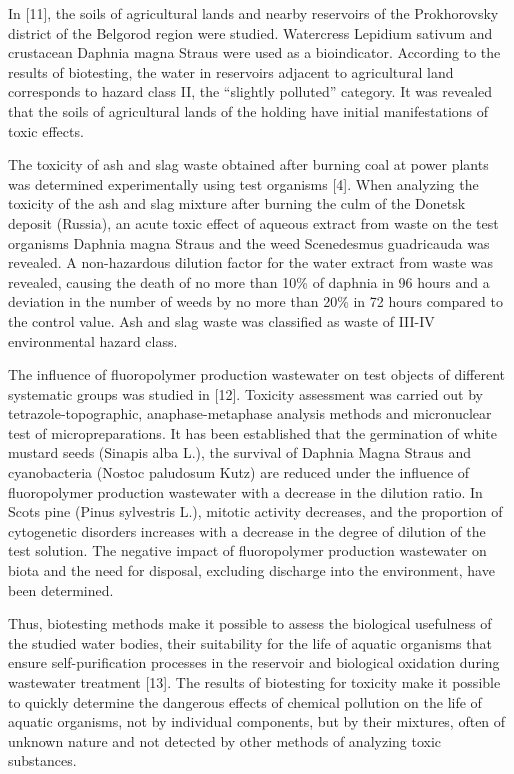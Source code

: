 \begin{multicols}{2}
In {[}11{]}, the soils of agricultural lands and nearby reservoirs of
the Prokhorovsky district of the Belgorod region were studied.
Watercress Lepidium sativum and crustacean Daphnia magna Straus were
used as a bioindicator. According to the results of biotesting, the
water in reservoirs adjacent to agricultural land corresponds to hazard
class II, the ``slightly polluted'' category. It was revealed that the
soils of agricultural lands of the holding have initial manifestations
of toxic effects.

The toxicity of ash and slag waste obtained after burning coal at power
plants was determined experimentally using test organisms {[}4{]}. When
analyzing the toxicity of the ash and slag mixture after burning the
culm of the Donetsk deposit (Russia), an acute toxic effect of aqueous
extract from waste on the test organisms Daphnia magna Straus and the
weed Scenedesmus guadricauda was revealed. A non-hazardous dilution
factor for the water extract from waste was revealed, causing the death
of no more than 10\% of daphnia in 96 hours and a deviation in the
number of weeds by no more than 20\% in 72 hours compared to the control
value. Ash and slag waste was classified as waste of III-IV
environmental hazard class.

The influence of fluoropolymer production wastewater on test objects of
different systematic groups was studied in {[}12{]}. Toxicity assessment
was carried out by tetrazole-topographic, anaphase-metaphase analysis
methods and micronuclear test of micropreparations. It has been
established that the germination of white mustard seeds (Sinapis alba
L.), the survival of Daphnia Magna Straus and cyanobacteria (Nostoc
paludosum Kutz) are reduced under the influence of fluoropolymer
production wastewater with a decrease in the dilution ratio. In Scots
pine (Pinus sylvestris L.), mitotic activity decreases, and the
proportion of cytogenetic disorders increases with a decrease in the
degree of dilution of the test solution. The negative impact of
fluoropolymer production wastewater on biota and the need for disposal,
excluding discharge into the environment, have been determined.

Thus, biotesting methods make it possible to assess the biological
usefulness of the studied water bodies, their suitability for the life
of aquatic organisms that ensure self-purification processes in the
reservoir and biological oxidation during wastewater treatment {[}13{]}.
The results of biotesting for toxicity make it possible to quickly
determine the dangerous effects of chemical pollution on the life of
aquatic organisms, not by individual components, but by their mixtures,
often of unknown nature and not detected by other methods of analyzing
toxic substances.


\end{multicols}
